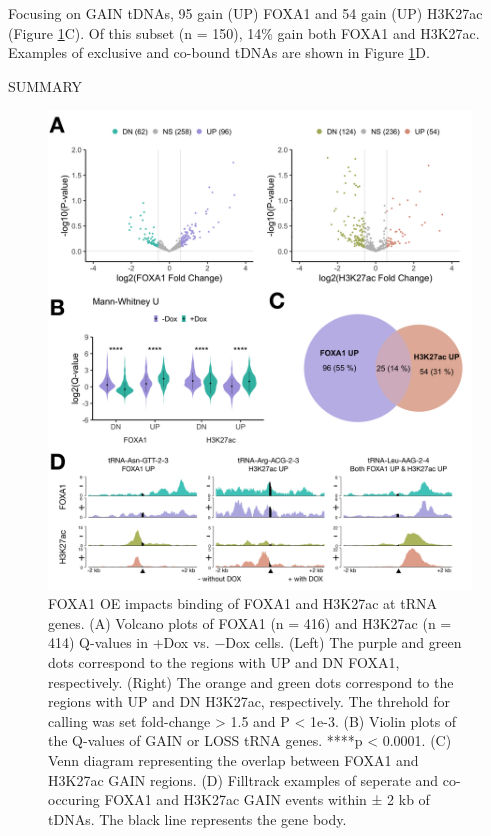 \documentclass[
  12pt,
]{article}
\begin{document}
Focusing on GAIN tDNAs, 95 gain (UP) FOXA1 and 54 gain (UP) H3K27ac (Figure \ref{fig:results-2}C).
Of this subset (n = 150), 14\% gain both FOXA1 and H3K27ac.
Examples of exclusive and co-bound tDNAs are shown in Figure \ref{fig:results-2}D.

SUMMARY

\begin{figure}[H]
\includegraphics[width=1\linewidth]{../images/results-02} \caption{FOXA1 OE impacts binding of FOXA1 and H3K27ac at tRNA genes. (A) Volcano plots of FOXA1 (n = 416) and H3K27ac (n = 414) Q-values in +Dox vs. −Dox cells. (Left) The purple and green dots correspond to the regions with UP and DN FOXA1, respectively. (Right) The orange and green dots correspond to the regions with UP and DN H3K27ac, respectively. The threhold for calling was set fold-change > 1.5 and P < 1e-3. (B) Violin plots of the Q-values of GAIN or LOSS tRNA genes. ****p < 0.0001. (C) Venn diagram representing the overlap between FOXA1 and H3K27ac GAIN regions. (D) Filltrack examples of seperate and co-occuring FOXA1 and H3K27ac GAIN events within ± 2 kb of tDNAs. The black line represents the gene body.}\label{fig:results-2}
\end{figure}
\end{document}
